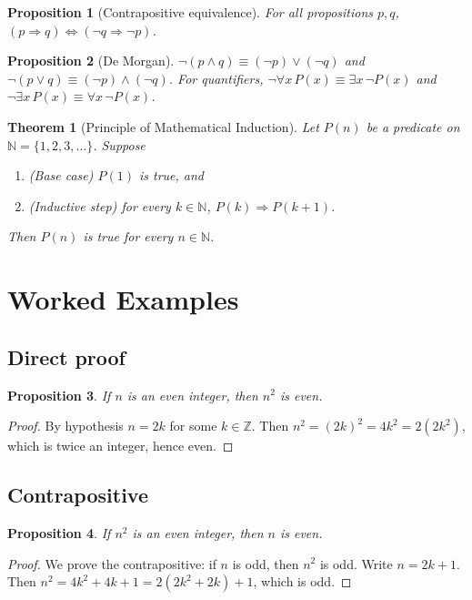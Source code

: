 \documentclass[11pt]{article}
\newtheorem{theorem}{Theorem}
\newtheorem{proposition}{Proposition}
\begin{document}
\begin{proposition}[Contrapositive equivalence]
For all propositions $p, q$, $(p \Rightarrow q) \Leftrightarrow (\neg q \Rightarrow \neg p)$.
\end{proposition}

\begin{proposition}[De Morgan]
$\neg(p \land q) \equiv (\neg p) \lor (\neg q)$ and
$\neg(p \lor q) \equiv (\neg p) \land (\neg q)$. For quantifiers,
$\neg \forall x\, P(x) \equiv \exists x\, \neg P(x)$ and
$\neg \exists x\, P(x) \equiv \forall x\, \neg P(x)$.
\end{proposition}

\begin{theorem}[Principle of Mathematical Induction]
\label{thm:induction}
Let $P(n)$ be a predicate on $\mathbb{N} = \{1, 2, 3, \dots\}$. Suppose
\begin{enumerate}
  \item (Base case) $P(1)$ is true, and
  \item (Inductive step) for every $k \in \mathbb{N}$, $P(k) \Rightarrow P(k+1)$.
\end{enumerate}
Then $P(n)$ is true for every $n \in \mathbb{N}$.
\end{theorem}

\section*{Worked Examples}

\subsection*{Direct proof}

\begin{proposition}
If $n$ is an even integer, then $n^2$ is even.
\end{proposition}
\begin{proof}
By hypothesis $n = 2k$ for some $k \in \mathbb{Z}$. Then
$n^2 = (2k)^2 = 4k^2 = 2(2k^2)$, which is twice an integer, hence even.
\end{proof}

\subsection*{Contrapositive}

\begin{proposition}
If $n^2$ is an even integer, then $n$ is even.
\end{proposition}
\begin{proof}
We prove the contrapositive: if $n$ is odd, then $n^2$ is odd. Write
$n = 2k+1$. Then $n^2 = 4k^2 + 4k + 1 = 2(2k^2 + 2k) + 1$, which is odd.
\end{proof}
\end{document}
